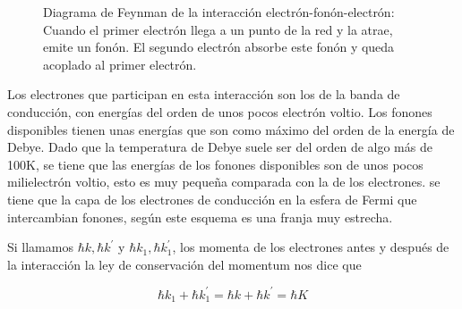 \begin{figure}[H]
    \center
    \caption[Diagrama de Feynman de la interacción electrón-fonón-electrón]{Diagrama de Feynman de la interacción electrón-fonón-electrón: Cuando el primer electrón llega a un punto de la red y la atrae, emite un fonón. El segundo electrón absorbe este fonón y queda acoplado al primer electrón.}
    \label{fig:feynmanefe}
\end{figure}

Los electrones que participan en esta interacción son los de la banda de conducción, con energías del orden de unos pocos electrón voltio. Los fonones disponibles tienen unas energías que son como máximo del orden de la energía de Debye. Dado que la temperatura de Debye suele ser del orden de algo más de 100K, se tiene que las energías de los fonones disponibles son de unos pocos milielectrón voltio, esto es muy pequeña comparada con la de los electrones. se tiene que la capa de los electrones de conducción en la esfera de Fermi que intercambian fonones, según este esquema es una franja muy estrecha.

Si llamamos $\hbar k, \hbar k^\prime$ y $\hbar k_1, \hbar k_1^\prime$, los momenta de los electrones antes y después de la interacción la ley de conservación del momentum nos dice que

\begin{equation*}
    \hbar k_1 + \hbar k_1^\prime = \hbar k + \hbar k^\prime = \hbar K
\end{equation*}


